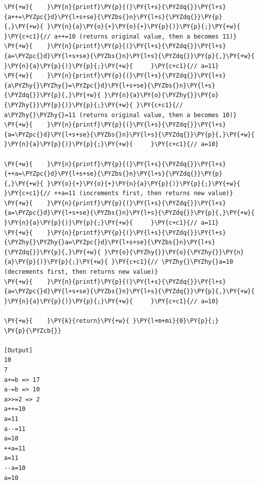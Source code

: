 \begin{Verbatim}[label=\makebox{\url{https://github.com/lucabaldini/cmepda/tree/master/slides/latex/snippets/assignment_and_increment.c}},commandchars=\\\{\}]
\PY{+w}{    }\PY{n}{printf}\PY{p}{(}\PY{l+s}{\PYZdq{}}\PY{l+s}{a++=\PYZpc{}d}\PY{l+s+se}{\PYZbs{}n}\PY{l+s}{\PYZdq{}}\PY{p}{,}\PY{+w}{ }\PY{n}{a}\PY{o}{+}\PY{o}{+}\PY{p}{)}\PY{p}{;}\PY{+w}{ }\PY{c+c1}{// a++=10 (returns original value, then a becomes 11)}
\PY{+w}{    }\PY{n}{printf}\PY{p}{(}\PY{l+s}{\PYZdq{}}\PY{l+s}{a=\PYZpc{}d}\PY{l+s+se}{\PYZbs{}n}\PY{l+s}{\PYZdq{}}\PY{p}{,}\PY{+w}{ }\PY{n}{a}\PY{p}{)}\PY{p}{;}\PY{+w}{     }\PY{c+c1}{// a=11}
\PY{+w}{    }\PY{n}{printf}\PY{p}{(}\PY{l+s}{\PYZdq{}}\PY{l+s}{a\PYZhy{}\PYZhy{}=\PYZpc{}d}\PY{l+s+se}{\PYZbs{}n}\PY{l+s}{\PYZdq{}}\PY{p}{,}\PY{+w}{ }\PY{n}{a}\PY{o}{\PYZhy{}}\PY{o}{\PYZhy{}}\PY{p}{)}\PY{p}{;}\PY{+w}{ }\PY{c+c1}{// a\PYZhy{}\PYZhy{}=11 (returns original value, then a becomes 10)}
\PY{+w}{    }\PY{n}{printf}\PY{p}{(}\PY{l+s}{\PYZdq{}}\PY{l+s}{a=\PYZpc{}d}\PY{l+s+se}{\PYZbs{}n}\PY{l+s}{\PYZdq{}}\PY{p}{,}\PY{+w}{ }\PY{n}{a}\PY{p}{)}\PY{p}{;}\PY{+w}{     }\PY{c+c1}{// a=10}

\PY{+w}{    }\PY{n}{printf}\PY{p}{(}\PY{l+s}{\PYZdq{}}\PY{l+s}{++a=\PYZpc{}d}\PY{l+s+se}{\PYZbs{}n}\PY{l+s}{\PYZdq{}}\PY{p}{,}\PY{+w}{ }\PY{o}{+}\PY{o}{+}\PY{n}{a}\PY{p}{)}\PY{p}{;}\PY{+w}{ }\PY{c+c1}{// ++a=11 (increments first, then returns new value)}
\PY{+w}{    }\PY{n}{printf}\PY{p}{(}\PY{l+s}{\PYZdq{}}\PY{l+s}{a=\PYZpc{}d}\PY{l+s+se}{\PYZbs{}n}\PY{l+s}{\PYZdq{}}\PY{p}{,}\PY{+w}{ }\PY{n}{a}\PY{p}{)}\PY{p}{;}\PY{+w}{     }\PY{c+c1}{// a=11}
\PY{+w}{    }\PY{n}{printf}\PY{p}{(}\PY{l+s}{\PYZdq{}}\PY{l+s}{\PYZhy{}\PYZhy{}a=\PYZpc{}d}\PY{l+s+se}{\PYZbs{}n}\PY{l+s}{\PYZdq{}}\PY{p}{,}\PY{+w}{ }\PY{o}{\PYZhy{}}\PY{o}{\PYZhy{}}\PY{n}{a}\PY{p}{)}\PY{p}{;}\PY{+w}{ }\PY{c+c1}{// \PYZhy{}\PYZhy{}a=10 (decrements first, then returns new value)}
\PY{+w}{    }\PY{n}{printf}\PY{p}{(}\PY{l+s}{\PYZdq{}}\PY{l+s}{a=\PYZpc{}d}\PY{l+s+se}{\PYZbs{}n}\PY{l+s}{\PYZdq{}}\PY{p}{,}\PY{+w}{ }\PY{n}{a}\PY{p}{)}\PY{p}{;}\PY{+w}{     }\PY{c+c1}{// a=10}

\PY{+w}{    }\PY{k}{return}\PY{+w}{ }\PY{l+m+mi}{0}\PY{p}{;}
\PY{p}{\PYZcb{}}

[Output]
10
7
a+=b => 17
a-=b => 10
a>>=2 => 2
a++=10
a=11
a--=11
a=10
++a=11
a=11
--a=10
a=10
\end{Verbatim}